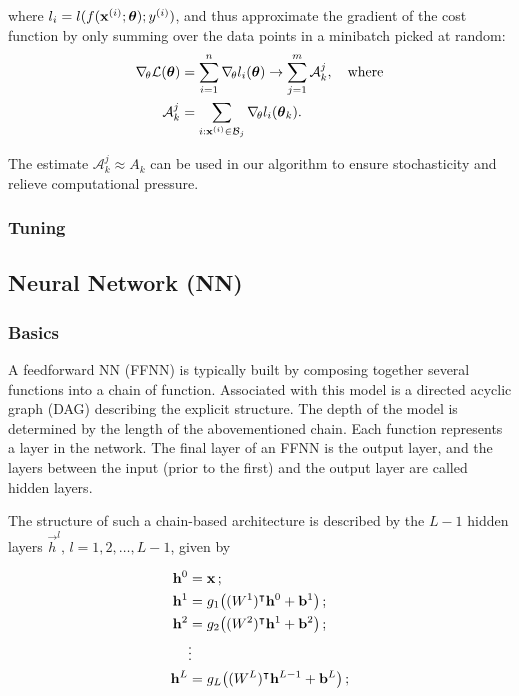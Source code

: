         where $l_i = l(f(\mathbf{x}^{(i)};\boldsymbol{\theta}); y^{(i)})$, and thus approximate the gradient of the cost function by only summing over the data points in a minibatch picked at random:
        \begin{equation}\label{eq:sgd_gradient}
            \begin{split}
            \nabla_{\!\theta} \mathcal{L}(\boldsymbol{\theta}) &= \sum_{i=1}^n \nabla_{\!\theta}l_i(\boldsymbol{\theta}) \to \sum_{j=1}^{m}\mathcal{A}_k^j, \quad \mathrm{where} \\
            \mathcal{A}^j_k &= \sum_{i:\mathbf{x}^{(i)} \in\mathcal{B}_j }\nabla_{\!\theta} l_i(\boldsymbol{\theta}_k).
            \end{split}
        \end{equation}

        The estimate $\mathcal{A}_k^j \approx A_k$ can be used in our algorithm to ensure stochasticity and relieve computational pressure.
    
    \subsubsection{Tuning}\label{sec:tuning}

\subsection{Neural Network (NN)}\label{sec:neural_network}

    \subsubsection{Basics}\label{sec:basics}

    A feedforward NN (FFNN) is typically built by composing together several functions into a chain of function. Associated with this model is a directed acyclic graph (DAG) describing the explicit structure. The depth of the model is determined by the length of the abovementioned chain. Each function represents a layer in the network. The final layer of an FFNN is the output layer, and the layers between the input (prior to the first) and the output layer are called hidden layers. \citep{Goodfellow2016}

    The structure of such a chain-based architecture is described by the $L-1$ hidden layers $\vec{h}^l,\,l=1,2, \dots, L-1$, given by

    \begin{subequations}
        \begin{align} 
            \vec{h}^0 &= \vec{x}\,; \\%
            \vec{h}^1 &= g_1 \big((W^1)\TT \vec{h}^0 + \vec{b}^1\big)\,; \\
            \vec{h}^2 &= g_2 \big( (W^2)\TT \vec{h}^1 + \vec{b}^2\big)\,; \\
            &\vdots \nonumber \\
            \vec{h}^{L} &= g_L \big((W^{L})\TT \vec{h}^{L-1} + \vec{b}^L\big)\,;             
        \end{align}
    \end{subequations}

